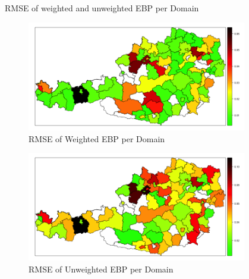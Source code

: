 \documentclass[fleqn,final]{beamer}
\newcommand{\Pheight}{\rule[-5mm]{0cm}{1cm}}
\begin{document}
\begin{frame}
\begin{columns}[t]
\begin{column}{.3\linewidth}
\begin{block}{RMSE of weighted and unweighted EBP per Domain \Pheight}
\begin{center}
	\begin{figure}
		\includegraphics[width=0.9\textwidth]{EBPWeightedRMSE}
		\caption{RMSE of Weighted EBP per Domain}
	\end{figure}
		\begin{figure}
		\includegraphics[width=0.9\textwidth]{EBPUnweightedRMSE}
		\caption{RMSE of Unweighted EBP per Domain}
	\end{figure}
\end{center}

\end{block}

\end{column}

%

\begin{column}{.3\linewidth}


\end{column}
\end{columns}
\end{frame}
\end{document}
